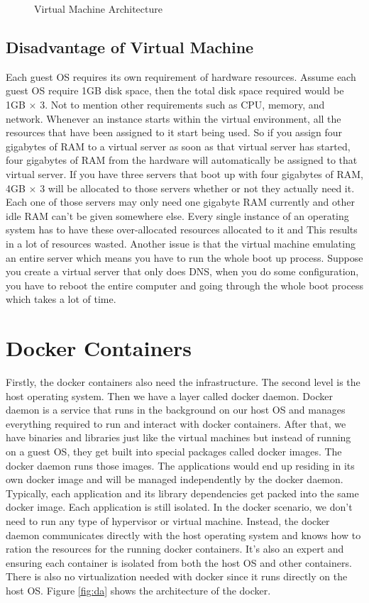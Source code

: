 \documentclass{sig-alternate}
\begin{document}
\begin{figure}[ht]
\centering
{}
\caption{Virtual Machine Architecture}
\label{fig:vma}
\vskip -6pt
\end{figure}

\subsection{Disadvantage of Virtual Machine}
Each guest OS requires its own requirement of hardware resources. Assume each guest OS require 1GB disk space, then the total disk space required would be 1GB $\times$ 3. Not to mention other requirements such as CPU, memory, and network. Whenever an instance starts within the virtual environment, all the resources that have been assigned to it start being used. So if you assign four gigabytes of RAM to a virtual server as soon as that virtual server has started, four gigabytes of RAM from the hardware will automatically be assigned to that virtual server. If you have three servers that boot up with four gigabytes of RAM, 4GB $\times$ 3 will be allocated to those servers whether or not they actually need it. Each one of those servers may only need one gigabyte RAM currently and other idle RAM can't be given somewhere else. Every single instance of an operating system has to have these over-allocated resources allocated to it and  This results in a lot of resources wasted. Another issue is that the virtual machine emulating an entire server which means you have to run the whole boot up process. Suppose you create a virtual server that only does DNS, when you do some configuration, you have to reboot the entire computer and going through the whole boot process which takes a lot of time. 

\section{Docker Containers}
Firstly, the docker containers also need the infrastructure. The second level is the host operating system. Then we have a layer called docker daemon. Docker daemon is a service that runs in the background on our host OS and manages everything required to run and interact with docker containers. After that, we have binaries and libraries just like the virtual machines but instead of running on a guest OS, they get built into special packages called docker images. The docker daemon runs those images. The applications would end up residing in its own docker image and will be managed independently by the docker daemon. Typically, each application and its library dependencies get packed into the same docker image. Each application is still isolated. In the docker scenario, we don't need to run any type of hypervisor or virtual machine. Instead, the docker daemon communicates directly with the host operating system and knows how to ration the resources for the running docker containers. It's also an expert and ensuring each container is isolated from both the host OS and other containers. There is also no virtualization needed with docker since it runs directly on the host OS. Figure \ref{fig:da} shows the architecture of the docker. 
\end{document}
